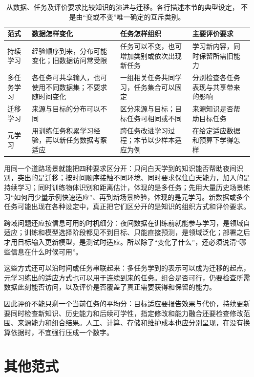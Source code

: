 \begin{table}[htbp]
  \centering
  \small
  \begin{tabularx}{\linewidth}{@{}lXXX@{}}
    \toprule
    \textbf{范式} & \textbf{数据怎样变化} & \textbf{任务怎样组织} & \textbf{主要评价要求} \\
    \midrule
    持续学习 & 经验顺序到来，分布可能变化；旧数据访问常受限 & 任务可以不变，也可增加类别或依次出现新任务 & 学习新内容，同时保留所需旧能力 \\
    多任务学习 & 各任务可共享输入，也可使用不同数据集；不要求随时间变化 & 一组相关任务共同学习，任务集合可以固定 & 分别检查各任务表现与共享带来的影响 \\
    迁移学习 & 来源与目标的分布可以不同 & 区分来源与目标；目标任务可相同或不同 & 来源知识是否帮助目标任务 \\
    元学习 & 用训练任务积累学习经验，再以新任务数据考察适应 & 跨任务改进学习过程；本节以少样本适应为例 & 在给定适应数据和预算下学得怎样 \\
    \bottomrule
  \end{tabularx}
  \caption{从数据、任务及评价要求比较知识的演进与迁移。各行描述本节的典型设定，
  不是由“变或不变”唯一确定的互斥类别。}
  \label{tab:knowledge-evolution-comparison}
\end{table}

用同一个道路场景就能把四种要求区分开：只问白天学到的知识能否帮助夜间识别，突出的是迁移；按时间顺序接触不同环境、同时要求保住白天能力，加入的是持续学习；同时训练物体识别和距离估计，体现的是多任务；先用大量历史场景练习“如何用少量示例快速适应”、再到新场景检验，体现的是元学习。新数据或多个任务可能出现在各种设定中，真正把它们区分开的是知识的组织方式和评价要求。

跨域问题还应按信息可用的时机细分：夜间数据在训练前就能参与学习，是领域自适应；训练和模型选择阶段都见不到目标、只能直接预测，是领域泛化；部署之后才用目标输入更新模型，是测试时适应。所以除了“变化了什么”，还必须说清“哪些信息在什么时候可用”。

这些方式还可以沿时间或任务串联起来：多任务学到的表示可以成为迁移的起点，元学习练出的适应方式也可以用于连续到来的任务。组合是否可行，仍要检查所需数据此刻能否访问，以及评价是否覆盖了真正需要获得和保留的能力。

因此评价不能只剩一个当前任务的平均分：目标适应要报告效果与代价，持续更新要同时检查新知识、历史能力和后续可学性，指定修改和能力融合还要检查修改范围、来源能力和组合结果。人工、计算、存储和维护成本也应分别呈现，在没有换算依据时，不宜强行压成一个数字。

\section{其他范式}
\label{sec:other-learning-settings}

